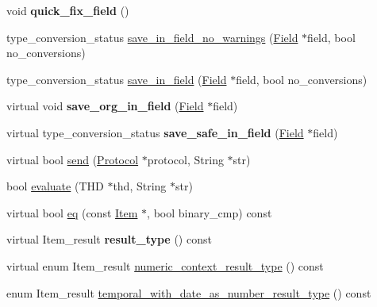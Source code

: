\begin{DoxyCompactItemize}
\mbox{\label{classItem_af4f4f80d9a7b094b515e10a5cac365e4}} 
void {\bfseries quick\+\_\+fix\+\_\+field} ()
\item 
type\+\_\+conversion\+\_\+status \mbox{\hyperlink{classItem_a965258368f10f5b882a532602d328baa}{save\+\_\+in\+\_\+field\+\_\+no\+\_\+warnings}} (\mbox{\hyperlink{classField}{Field}} $\ast$field, bool no\+\_\+conversions)
\item 
type\+\_\+conversion\+\_\+status \mbox{\hyperlink{classItem_acf4c1888a07e9e0dd5787283c6569545}{save\+\_\+in\+\_\+field}} (\mbox{\hyperlink{classField}{Field}} $\ast$field, bool no\+\_\+conversions)
\item 
\mbox{\label{classItem_afbcbd13d1dd060239d6ca2031e587c07}} 
virtual void {\bfseries save\+\_\+org\+\_\+in\+\_\+field} (\mbox{\hyperlink{classField}{Field}} $\ast$field)
\item 
\mbox{\label{classItem_a64760ce4d915d0a0804dc479fee18fa6}} 
virtual type\+\_\+conversion\+\_\+status {\bfseries save\+\_\+safe\+\_\+in\+\_\+field} (\mbox{\hyperlink{classField}{Field}} $\ast$field)
\item 
virtual bool \mbox{\hyperlink{classItem_a7d1b934e9612e1c78bd369b31e3d9cb1}{send}} (\mbox{\hyperlink{classProtocol}{Protocol}} $\ast$protocol, String $\ast$str)
\item 
bool \mbox{\hyperlink{classItem_ab0f6b295c74578740e30998424daa717}{evaluate}} (T\+HD $\ast$thd, String $\ast$str)
\item 
virtual bool \mbox{\hyperlink{classItem_af0957bbdb9a256de0cd29f1adcae28be}{eq}} (const \mbox{\hyperlink{classItem}{Item}} $\ast$, bool binary\+\_\+cmp) const
\item 
\mbox{\label{classItem_a651fe4ca331108ae6cf364691815303a}} 
virtual Item\+\_\+result {\bfseries result\+\_\+type} () const
\item 
virtual enum Item\+\_\+result \mbox{\hyperlink{classItem_a0cd3592a280aa2306ea9abfeae3f632b}{numeric\+\_\+context\+\_\+result\+\_\+type}} () const
\item 
enum Item\+\_\+result \mbox{\hyperlink{classItem_af87ae536f54acffbc047f65e7c14d0b4}{temporal\+\_\+with\+\_\+date\+\_\+as\+\_\+number\+\_\+result\+\_\+type}} () const
\item 
\mbox{\label{classItem_af5a0eb3b223b0a39e9c6f4216343ac95}} 

\end{DoxyCompactItemize}
